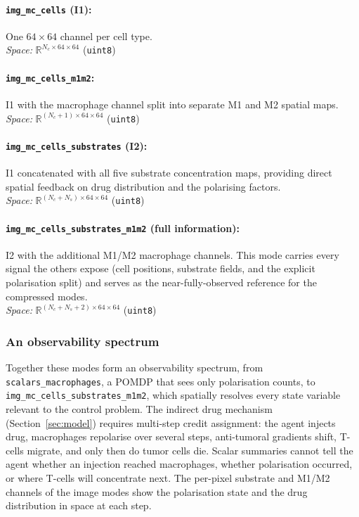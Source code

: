 \documentclass{article}
\begin{document}
\paragraph{\texttt{img\_mc\_cells} (I1):}
One $64{\times}64$ channel per cell type.
\\ \textit{Space:} $\mathbb{R}^{N_c \times 64 \times 64}$ (\texttt{uint8})

\paragraph{\texttt{img\_mc\_cells\_m1m2}:}
I1 with the macrophage channel split into separate M1 and M2 spatial maps.
\\ \textit{Space:} $\mathbb{R}^{(N_c+1) \times 64 \times 64}$ (\texttt{uint8})

\paragraph{\texttt{img\_mc\_cells\_substrates} (I2):}
I1 concatenated with all five substrate concentration maps, providing direct
spatial feedback on drug distribution and the polarising factors.
\\ \textit{Space:} $\mathbb{R}^{(N_c + N_s) \times 64 \times 64}$ (\texttt{uint8})

\paragraph{\texttt{img\_mc\_cells\_substrates\_m1m2} (full information):}
I2 with the additional M1/M2 macrophage channels. This mode carries every
signal the others expose (cell positions, substrate fields, and the explicit
polarisation split) and serves as the near-fully-observed reference for the
compressed modes.
\\ \textit{Space:} $\mathbb{R}^{(N_c + N_s + 2) \times 64 \times 64}$ (\texttt{uint8})

\subsubsection*{An observability spectrum}

Together these modes form an observability spectrum, from
\texttt{scalars\_macrophages}, a POMDP that sees only polarisation counts, to
\texttt{img\_mc\_cells\_substrates\_m1m2}, which spatially resolves every state
variable relevant to the control problem. The indirect drug mechanism
(Section~\ref{sec:model}) requires multi-step credit assignment: the agent
injects drug, macrophages repolarise over several steps, anti-tumoral gradients
shift, T-cells migrate, and only then do tumor cells die. Scalar summaries
cannot tell the agent whether an injection reached macrophages, whether
polarisation occurred, or where T-cells will concentrate next. The per-pixel
substrate and M1/M2 channels of the image modes show the polarisation state and
the drug distribution in space at each step.
\end{document}
